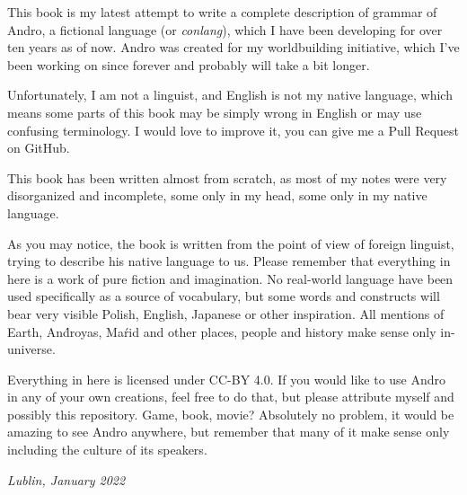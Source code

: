 This book is my latest attempt to write a complete description of grammar of
Andro, a fictional language (or \emph{conlang}), which I have been developing
for over ten years as of now. Andro was created for my worldbuilding initiative,
which I've been working on since forever and probably will take a bit longer.

Unfortunately, I am not a linguist, and English is not my native language, which
means some parts of this book may be simply wrong in English or may use
confusing terminology. I would love to improve it, you can give me a Pull
Request on GitHub.

This book has been written almost from scratch, as most of my notes were very
disorganized and incomplete, some only in my head, some only in my native
language.

As you may notice, the book is written from the point of view of foreign
linguist, trying to describe his native language to us. Please remember that
everything in here is a work of pure fiction and imagination. No real-world
language have been used specifically as a source of vocabulary, but some words
and constructs will bear very visible Polish, English, Japanese or other
inspiration. All mentions of Earth, And́royas, Maŕid and other places, people
and history make sense only in-universe.

Everything in here is licensed under CC-BY 4.0. If you would like to use Andro
in any of your own creations, feel free to do that, but please attribute myself
and possibly this repository. Game, book, movie? Absolutely no problem, it would
be amazing to see Andro anywhere, but remember that many of it make sense only
including the culture of its speakers.

\begin{flushright}\itshape\footnotesize
    Lublin, January 2022
\end{flushright}